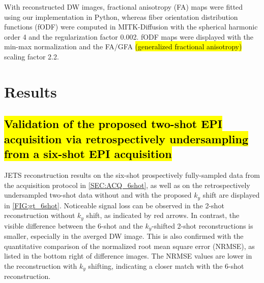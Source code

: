 \documentclass[preprint,12pt,authoryear,review]{elsarticle}
\begin{document}
    With reconstructed DW images, fractional anisotropy (FA) maps
    \citep{basser_1994_dmri} were fitted using our implementation in Python,
    whereas fiber orientation distribution functions (fODF)
    \citep{aganj_2009_solidangle}
    were computed in MITK-Diffusion \citep{fritzsche_2012_mitk_diff}
    with the spherical harmonic order \num{4} and the regularization factor \num{0.002}.
    fODF maps were displayed with the min-max normalization
    and the FA/GFA \hl{(generalized fractional anisotropy)}
    scaling factor \num{2.2}.

    \pagebreak

    \section{Results}
    \label{SEC_Resl}

    \subsection{\hl{Validation of the proposed two-shot EPI acquisition via retrospectively undersampling from a six-shot EPI acquisition}}

    JETS reconstruction results on
    the six-shot prospectively fully-sampled data
    from the acquisition protocol in \cref{SEC:ACQ_6shot},
    as well as on the retrospectively undersampled two-shot data
    without and with the proposed $k_y$ shift
    are displayed in \cref{FIG:gt_6shot}.
    Noticeable signal loss can be observed in the 2-shot reconstruction
    without $k_y$ shift, as indicated by red arrows.
    In contrast, the visible difference between the 6-shot and
    the $k_y$-shifted 2-shot reconstructions is smaller,
    especially in the averged DW image.
    This is also confirmed with the quantitative comparison
    of the normalized root mean square error (NRMSE),
    as listed in the bottom right of difference images.
    The NRMSE values are lower in the reconstruction
    with $k_y$ shifting,
    indicating a closer match with the 6-shot reconstruction.



\end{document}
